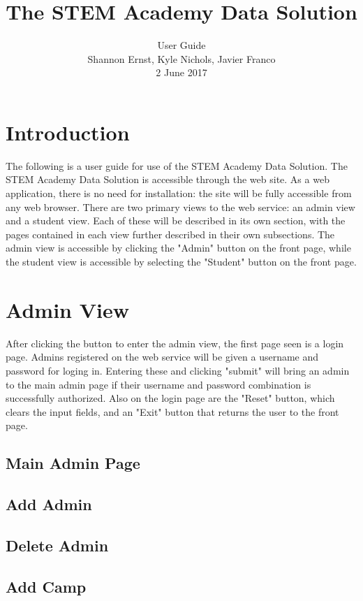 \documentclass[letterpaper,10pt,serif, draftclsnofoot,onecolumn, compsoc, titlepage]{IEEEtran}
\title{The STEM Academy Data Solution}
\author{User Guide \\ Shannon Ernst, Kyle Nichols, Javier Franco\\ 2 June 2017}
\begin{document}
\maketitle

\newpage
\tableofcontents
\newpage

\section{Introduction}
The following is a user guide for use of the STEM Academy Data Solution.
The STEM Academy Data Solution is accessible through the web site. %
As a web application, there is no need for installation: the site will be fully accessible from any web browser. %
There are two primary views to the web service: an admin view and a student view.
Each of these will be described in its own section, with the pages contained in each view further described in their own subsections.
The admin view is accessible by clicking the "Admin" button on the front page, while the student view is accessible by selecting the "Student" button on the front page.

\section{Admin View}
After clicking the button to enter the admin view, the first page seen is a login page.
Admins registered on the web service will be given a username and password for loging in.
Entering these and clicking "submit" will bring an admin to the main admin page if their username and password combination is successfully authorized.
Also on the login page are the "Reset" button, which clears the input fields, and an "Exit" button that returns the user to the front page.
\subsection{Main Admin Page}
\subsection{Add Admin}
\subsection{Delete Admin}
\subsection{Add Camp}
\end{document}
